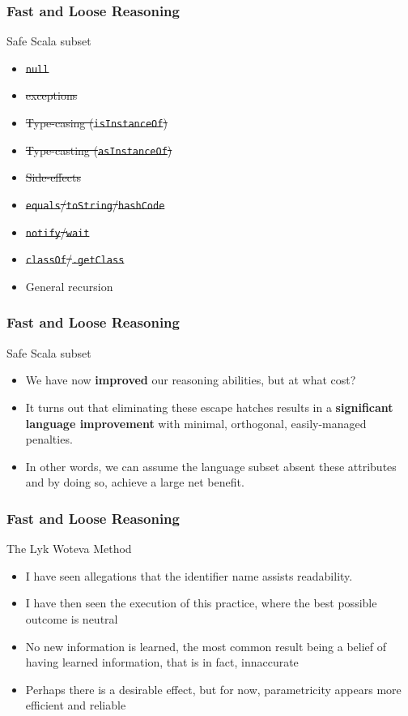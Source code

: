 \begin{frame}[fragile]
\frametitle{Fast and Loose Reasoning}
\begin{block}{Safe Scala subset}
\begin{itemize}
  \item \sout{\lstinline{null}}
  \item \sout{exceptions}
  \item \sout{Type-casing (\lstinline{isInstanceOf})}
  \item \sout{Type-casting (\lstinline{asInstanceOf})}
  \item \sout{Side-effects}
  \item \sout{\lstinline{equals}/\lstinline{toString}/\lstinline{hashCode}}
  \item \sout{\lstinline{notify}/\lstinline{wait}}
  \item \sout{\lstinline{classOf}/\lstinline{.getClass}}
  \item General recursion
\end{itemize}
\end{block}
\end{frame}

\begin{frame}[fragile]
\frametitle{Fast and Loose Reasoning}
\begin{block}{Safe Scala subset}
\begin{itemize}
  \item<1> We have now \textbf{improved} our reasoning abilities, but at what cost?
  \item<2> It turns out that eliminating these escape hatches results in a \textbf{significant language improvement} with minimal, orthogonal, easily-managed penalties.
  \item<3> In other words, we can assume the language subset absent these attributes and by doing so, achieve a large net benefit.
\end{itemize}
\end{block}
\end{frame}

\begin{frame}[fragile]
\frametitle{Fast and Loose Reasoning}
\begin{block}{The Lyk Woteva Method}
\begin{itemize}
  \item<1> I have seen allegations that the identifier name assists readability.
  \item<2> I have then seen the execution of this practice, where the best possible outcome is neutral
  \item<3> No new information is learned, the most common result being a belief of having learned information, that is in fact, innaccurate
  \item<4> Perhaps there is a desirable effect, but for now, parametricity appears more efficient and reliable
\end{itemize}
\end{block}
\end{frame}

